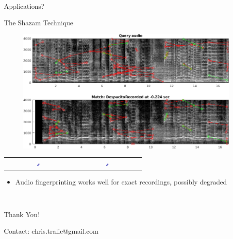 \documentclass{beamer}
\begin{document}
\begin{frame}{Applications?}


\end{frame}



\begin{frame}{The Shazam Technique}

\begin{figure}
	\centering
	\includegraphics[width=\textwidth]{DespacitoRecorded.png}
\end{figure}

\begin{tabular}{cc}
\hspace{6em} \href{run:Audio/fingerprint/DespacitoOrigClip.avi}{\includegraphics[width = 0.05\textwidth]{MusicalNote.png}}
&
\hspace{12em} \href{run:Audio/fingerprint/DespacitoRecorded.avi}{\includegraphics[width = 0.05\textwidth]{MusicalNote.png}}
\end{tabular}

\begin{itemize}[label=$\vartriangleright$]
\item Audio fingerprinting works well for exact recordings, possibly degraded
\end{itemize}

\scriptsize
{} \\

\end{frame}







\begin{frame}{Thank You!}

Contact: chris.tralie@gmail.com

\end{frame}
\end{document}
